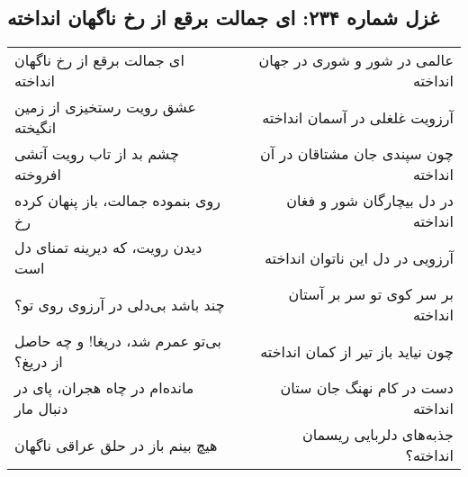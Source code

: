 \begin{center}
\section*{غزل شماره ۲۳۴: ای جمالت برقع از رخ ناگهان انداخته}
\label{sec:234}
\begin{longtable}{l p{0.5cm} r}
ای جمالت برقع از رخ ناگهان انداخته
&&
عالمی در شور و شوری در جهان انداخته
\\
عشق رویت رستخیزی از زمین انگیخته
&&
آرزویت غلغلی در آسمان انداخته
\\
چشم بد از تاب رویت آتشی افروخته
&&
چون سپندی جان مشتاقان در آن انداخته
\\
روی بنموده جمالت، باز پنهان کرده رخ
&&
در دل بیچارگان شور و فغان انداخته
\\
دیدن رویت، که دیرینه تمنای دل است
&&
آرزویی در دل این ناتوان انداخته
\\
چند باشد بی‌دلی در آرزوی روی تو؟
&&
بر سر کوی تو سر بر آستان انداخته
\\
بی‌تو عمرم شد، دریغا! و چه حاصل از دریغ؟
&&
چون نیاید باز تیر از کمان انداخته
\\
مانده‌ام در چاه هجران، پای در دنبال مار
&&
دست در کام نهنگ جان ستان انداخته
\\
هیچ بینم باز در حلق عراقی ناگهان
&&
جذبه‌های دلربایی ریسمان انداخته؟
\\
\end{longtable}
\end{center}
